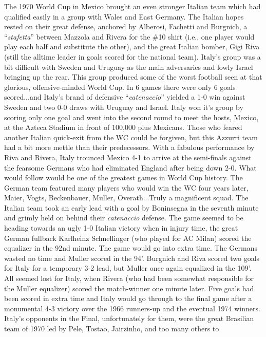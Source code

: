 The 1970 World Cup in Mexico brought an even stronger Italian team which had 
qualified easily in a group with Wales and East Germany. The Italian hopes 
rested on their great defense, anchored by Alberosi, Fachetti and Burgnich, a 
``\textit{stafetta}'' between Mazzola and Rivera for the \#10 shirt (i.e., one player would
play each half and substitute the other), and the great Italian bomber, Gigi 
Riva (still the alltime leader in goals scored for the national team). Italy's 
group was a bit difficult with Sweden and Uruguay as the main adversaries and 
lowly Israel bringing up the rear. This group produced some of the worst 
football seen at that glorious, offensive-minded World Cup. In 6 games there 
were only 6 goals scored...and Italy's brand of defensive ``\textit{catenaccio}'' yielded 
a 1-0 win against Sweden and two 0-0 draws with Uruguay and Israel. Italy won 
it's group by scoring only one goal and went into the second round to meet the 
hosts, Mexico, at the Azteca Stadium in front of 100,000 plus Mexicans. Those 
who feared another Italian quick-exit from the WC could be forgiven, but this 
Azzurri team had a bit more mettle than their predecessors. With a fabulous 
performance by Riva and Rivera, Italy trounced Mexico 4-1 to arrive at the 
semi-finals against the fearsome Germans who had eliminated England after being
down 2-0. What would follow would be one of the greatest games in World Cup
history. The German team featured many players who would win the WC four years 
later, Maier, Vogts, Beckenbauer, Muller, Overath...Truly a magnificent squad. 
The Italian team took an early lead with a goal by Boninsegna in the seventh 
minute and grimly held on behind their \textit{catenaccio} defense. The game seemed to 
be heading towards an ugly 1-0 Italian victory when in injury time, the great 
German fullback Karlheinz Schnellinger (who played for AC Milan) scored the 
equalizer in the 92nd minute. The game would go into extra time. The Germans 
wasted no time and Muller scored in the 94'. Burgnich and Riva scored two goals
for Italy for a temporary 3-2 lead, but Muller once again equalized in the 109'.
All seemed lost for Italy, when Rivera (who had been somewhat responsible for 
the Muller equalizer) scored the match-winner one minute later. Five goals had 
been scored in extra time and Italy would go through to the final game after a 
monumental 4-3 victory over the 1966 runners-up and the eventual 1974 winners. 
Italy's opponents in the Final, unfortunately for them, were the great 
Brasilian team of 1970 led by Pele, Tostao, Jairzinho, and too many others to 
